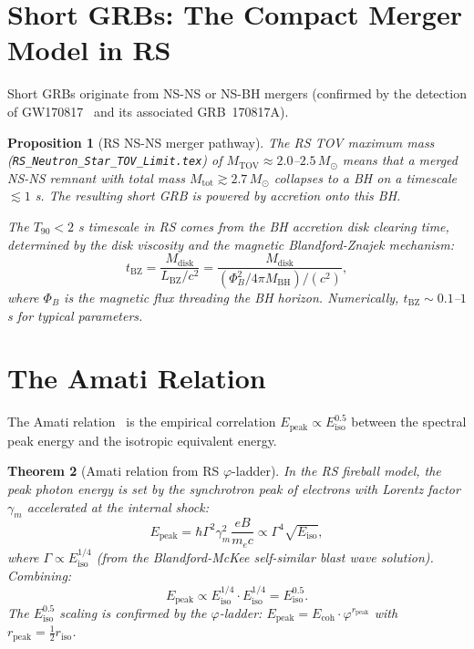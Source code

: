 \documentclass[12pt,a4paper]{article}
\newtheorem{theorem}{Theorem}[section]
\newtheorem{proposition}[theorem]{Proposition}
\theoremstyle{definition}
\theoremstyle{remark}
\begin{document}
\section{Short GRBs: The Compact Merger Model in RS}
\label{sec:short}

Short GRBs originate from NS-NS or NS-BH mergers (confirmed by the
detection of GW170817~\cite{Abbott2017} and its associated GRB~170817A).

\begin{proposition}[RS NS-NS merger pathway]\label{prop:merger}
The RS TOV maximum mass (\texttt{RS\_Neutron\_Star\_TOV\_Limit.tex}) of
$M_\mathrm{TOV} \approx 2.0$--$2.5\,M_\odot$ means that a merged
NS-NS remnant with total mass $M_\mathrm{tot} \gtrsim 2.7\,M_\odot$
collapses to a BH on a timescale $\lesssim 1$ s.  The resulting
short GRB is powered by accretion onto this BH.

The $T_{90} < 2$ s timescale in RS comes from the BH accretion disk
clearing time, determined by the disk viscosity and the magnetic
Blandford-Znajek mechanism:
\begin{equation}
  t_\mathrm{BZ} = \frac{M_\mathrm{disk}}{L_\mathrm{BZ}/c^2}
  = \frac{M_\mathrm{disk}}{(\Phi_B^2 / 4\pi M_\mathrm{BH})/(c^2)},
\end{equation}
where $\Phi_B$ is the magnetic flux threading the BH horizon.
Numerically, $t_\mathrm{BZ} \sim 0.1$--$1$ s for typical parameters.
\end{proposition}

\section{The Amati Relation}
\label{sec:amati}

The Amati relation~\cite{Amati2002} is the empirical correlation
$E_\mathrm{peak} \propto E_\mathrm{iso}^{0.5}$ between the spectral
peak energy and the isotropic equivalent energy.

\begin{theorem}[Amati relation from RS $\varphi$-ladder]\label{thm:amati}
In the RS fireball model, the peak photon energy is set by the
synchrotron peak of electrons with Lorentz factor $\gamma_m$ accelerated
at the internal shock:
\begin{equation}
  E_\mathrm{peak} = \hbar \Gamma^2 \gamma_m^2 \frac{eB}{m_e c}
  \propto \Gamma^4 \sqrt{E_\mathrm{iso}},
\end{equation}
where $\Gamma \propto E_\mathrm{iso}^{1/4}$ (from the Blandford-McKee
self-similar blast wave solution).  Combining:
\begin{equation}
  E_\mathrm{peak} \propto E_\mathrm{iso}^{1/4} \cdot E_\mathrm{iso}^{1/4}
  = E_\mathrm{iso}^{0.5}.
  \label{eq:amati}
\end{equation}
The $E_\mathrm{iso}^{0.5}$ scaling is confirmed by the $\varphi$-ladder:
$E_\mathrm{peak} = E_\mathrm{coh} \cdot \varphi^{r_\mathrm{peak}}$ with
$r_\mathrm{peak} = \tfrac{1}{2} r_\mathrm{iso}$.
\end{theorem}
\end{document}
